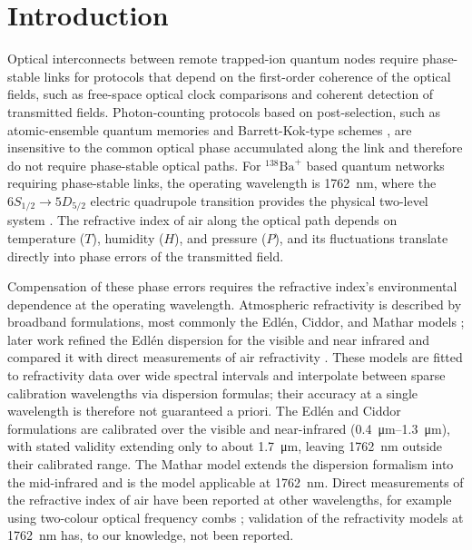 \documentclass[aps,prapplied,reprint,groupedaddress,twocolumn,superscriptaddress,linenumbers]{revtex4-2}
\begin{document}
\maketitle

\section{Introduction}
\label{sec:intro}

Optical interconnects between remote trapped-ion quantum nodes require phase-stable links for protocols that depend on the first-order coherence of the optical fields, such as free-space optical clock comparisons \cite{giorgetta2013optical,shen2022free} and coherent detection of transmitted fields. Photon-counting protocols based on post-selection, such as atomic-ensemble quantum memories \cite{duan2001long} and Barrett-Kok-type schemes \cite{barrett2005efficient}, are insensitive to the common optical phase accumulated along the link and therefore do not require phase-stable optical paths. For $^{138}\mathrm{Ba}^+$ based quantum networks requiring phase-stable links, the operating wavelength is \SI{1762}{\nano\meter}, where the $6S_{1/2} \rightarrow 5D_{5/2}$ electric quadrupole transition provides the physical two-level system \cite{dietrich2009barium,arnold2020precision}. The refractive index of air along the optical path depends on temperature ($T$), humidity ($H$), and pressure ($P$), and its fluctuations translate directly into phase errors of the transmitted field.

Compensation of these phase errors requires the refractive index's environmental dependence at the operating wavelength. Atmospheric refractivity is described by broadband formulations, most commonly the Edl\'{e}n, Ciddor, and Mathar models \cite{edlen1966refractive,ciddor1996refractive,mathar2007refractive}; later work refined the Edl{\'e}n dispersion for the visible and near infrared and compared it with direct measurements of air refractivity \cite{birch1993updated,bonsch1998measurement}. These models are fitted to refractivity data over wide spectral intervals and interpolate between sparse calibration wavelengths via dispersion formulas; their accuracy at a single wavelength is therefore not guaranteed a priori. The Edl\'{e}n and Ciddor formulations are calibrated over the visible and near-infrared (\SIrange{0.4}{1.3}{\micro\meter}), with stated validity extending only to about \SI{1.7}{\micro\meter}, leaving \SI{1762}{\nano\meter} outside their calibrated range. The Mathar model extends the dispersion formalism into the mid-infrared and is the model applicable at \SI{1762}{\nano\meter}. Direct measurements of the refractive index of air have been reported at other wavelengths, for example using two-colour optical frequency combs \cite{wu2013extremely,wu2014corrigendum}; validation of the refractivity models at \SI{1762}{\nano\meter} has, to our knowledge, not been reported.
\end{document}
